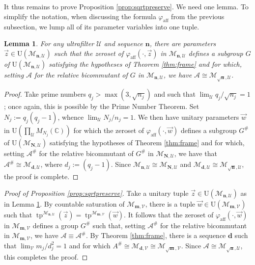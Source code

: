 \documentclass[12pt]{amsart}
\numberwithin{equation}{section}
\newtheorem{lem}[thm]{Lemma}
\theoremstyle{definition}
\newcommand{\C}{\mathbb{C}}
\def\cal{\mathcal}
\def\M{\mathcal{M}}
\newcommand\cU{{\cal U}}
\def \M{\mathcal{M}}
\begin{document}
It thus remains to prove Proposition \ref{prop:sqrtpreserve}.  We need one lemma.  To simplify the notation, when discussing the formula $\varphi_{\operatorname{aff}}$ from the previous subsection, we lump all of its parameter variables into one tuple.

\begin{lem}\label{lem:affinesqrt}
For any ultrafilter $\cU$ and sequence $\mathbf{n}$, there are parameters $\vec z\in \mathrm{U}(\M_{\mathbf{n},\cU})$ such that the zeroset of $\varphi_{\operatorname{aff}}(\cdot,\vec z)$ in $\M_{\mathbf{n},\cU}$ defines a subgroup $G$ of $\mathrm{U}(\M_{\mathbf{n},\cU})$ satisfying the hypotheses of Theorem \ref{thm:frame} and for which, setting $\mathcal{A}$ for the relative bicommutant of $G$ in $\M_{\mathbf{n},\cU}$, we have $\mathcal{A}\cong \M_{\sqrt{\mathbf{n}},\cU}$.
\end{lem}

\begin{proof}
Take prime numbers $q_j>\max(3,\sqrt{n_j})$ and such that $\lim_\cU q_j/\sqrt{n_j}=1$; once again, this is possible by the Prime Number Theorem.  Set $N_j:=q_j(q_j-1)$, whence $\lim_\cU N_j/n_j=1$.  We then have unitary parameters $\vec w$ in $\mathrm{U}(\prod_\cU M_{N_j}(\C))$ for which the zeroset of $\varphi_{\operatorname{aff}}(\cdot, \vec w)$ defines a subgroup $G^\#$ of $\mathrm{U}(\M_{\mathbf{N},\cU})$ satisfying the hypotheses of Theorem \ref{thm:frame} and for which, setting $\mathcal{A}^\#$ for the relative bicommutant of $G^\#$ in $\mathcal{M}_{\mathbf{N},\cU}$, we have that $\mathcal{A}^\#\cong \M_{\mathbf{d},\cU}$, where $d_j:=(q_j-1)$.  Since $\M_{\mathbf{n},\cU}\cong \M_{\mathbf{N},\cU}$ and $\M_{\mathbf{d},\cU}\cong \M_{\sqrt{\mathbf{n}},\cU}$, the proof is complete.
\end{proof}

\begin{proof}[Proof of Proposition \ref{prop:sqrtpreserve}]
Take a unitary tuple $\vec z\in \mathrm{U}(\M_{\mathbf{n},\cU})$ as in Lemma \ref{lem:affinesqrt}.  By countable saturation of $\M_{\mathbf{m},\mathcal{V}}$, there is a tuple $\vec w\in \mathrm{U}(\M_{\mathbf{m},\mathcal{V}})$ such that $\operatorname{tp}^{\M_{\mathbf{n},\cU}}(\vec z)=\operatorname{tp}^{\M_{\mathbf{m},\mathcal{V}}}(\vec w)$.  It follows that the zeroset of $\varphi_{\operatorname{aff}}(\cdot,\vec w)$ in $\M_{\mathbf{m},\mathcal{V}}$ defines a group $G^\#$ such that, setting $\mathcal{A}^\#$ for the relative bicommutant in $\M_{\mathbf{m},\mathcal{V}}$, we have $\mathcal{A}\equiv \mathcal{A}^\#$.  By Theorem \ref{thm:frame}, there is a sequence $\mathbf{d}$ such that $\lim_{\mathcal{V}} m_j/d_j^2=1$ and for which $A^\#\cong \M_{\mathbf{d},\mathcal{V}}\cong \M_{\sqrt{\mathbf{m}},\mathcal{V}}$.  Since $\mathcal{A}\cong \M_{\sqrt{\mathbf{n}},\cU}$, this completes the proof.
\end{proof}
\end{document}
